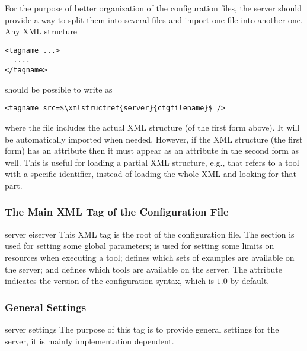 For the purpose of better organization of the configuration files, the
server should provide a way to split them into several files and
import one file into another one. Any XML structure

\medskip
\begin{lstlisting}
<tagname ...>
  ....
</tagname>
\end{lstlisting}

\medskip
\noindent
should be possible to write as

\medskip
\begin{lstlisting}
<tagname src=$\xmlstructref{server}{cfgfilename}$ />
\end{lstlisting}

\medskip
\noindent
where the file  includes the actual
XML structure (of the first form above). It will be automatically
imported when needed. However, if the XML structure (the first form)
has an attribute  then it must appear as an attribute in the
second form as well. This is useful for loading a partial XML
structure, e.g., that refers to a tool with a specific identifier,
instead of loading the whole XML and looking for that part.


\subsubsection{The Main XML Tag of the Configuration File}

\bigskip
\xmlstruct
{server}
{eiserver}
{%
This XML tag is the root of the configuration file.
%
The  section is used for setting some
global parameters;  is used for setting
some limits on resources when executing a tool; 
 defines which sets of examples are
available on the server; and  defines which
tools are available on the server.
%
The  attribute indicates the version of the
configuration syntax, which is $1.0$ by default.
}


\subsubsection{General Settings}

\bigskip
\xmlstruct
{server}
{settings}
{%
%
  The purpose of this tag is to provide general settings for the
  server, it is mainly implementation dependent.
%
}

